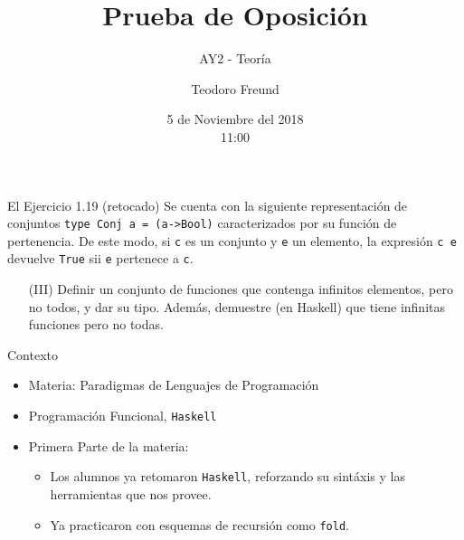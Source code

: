\documentclass[pdf
]{beamer}
\title{Prueba de Oposición}
\subtitle{AY2 - Teoría}
\author{\large{Teodoro Freund}}
\date{5 de Noviembre del 2018 \\ \footnotesize{11:00}} %
\begin{document}
\begin{frame}
\titlepage
\end{frame}

\begin{frame}{El Ejercicio 1.19 (retocado)}
Se cuenta con la siguiente representación de conjuntos \texttt{type Conj a = (a->Bool)} caracterizados por su
función de pertenencia. De este modo, si \texttt{c} es un conjunto y \texttt{e} un elemento, la expresión \texttt{c e} devuelve \texttt{True} sii \texttt{e}
pertenece a \texttt{c}.

\pause

\begin{enumerate}[label=(\roman*)]

\item[(III)] Definir un conjunto de funciones que contenga infinitos elementos, pero no todos, y dar su tipo. Además, demuestre (en Haskell) que tiene infinitas funciones pero no todas.

\end{enumerate}

\end{frame}






\begin{frame}{Contexto}
\begin{itemize}
\item Materia: Paradigmas de Lenguajes de Programación
\pause
\item Programación Funcional, \texttt{Haskell}
\pause

\item Primera Parte de la materia:
\begin{itemize}
\item Los alumnos ya retomaron \texttt{Haskell}, reforzando su sintáxis y las herramientas que nos provee.

\item Ya practicaron con esquemas de recursión como \texttt{fold}.

\end{itemize}


\end{itemize}

\end{frame}
\end{document}
